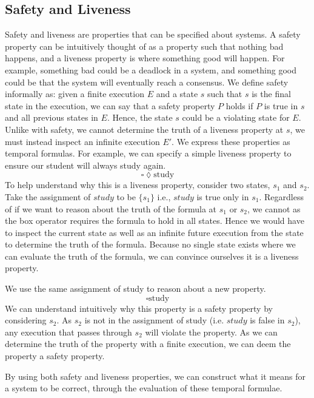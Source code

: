 \subsection{Safety and Liveness}
Safety and liveness are properties that can be specified about systems. A safety property can be intuitively thought of as a property such that nothing bad happens, and a liveness property is where something good will happen. For example, something bad could be a deadlock in a system, and something good could be that the system will eventually reach a consensus. We define safety informally as: given a finite execution $E$ and a state $s$ such that $s$ is the final state in the execution, we can say that a safety property $P$ holds if $P$ is true in $s$ and all previous states in $E$. Hence, the state $s$ could be a violating state for $E$. Unlike with safety, we cannot determine the truth of a liveness property at $s$, we must instead inspect an infinite execution $E'$. We express these properties as temporal formulas. For example, we can specify a simple liveness property to ensure our student will always study again.
\[
\square \lozenge \text{study}
\]
To help understand why this is a liveness property, consider two states, $s_1$ and $s_2$. Take the assignment of $study$ to be $\{s_1\}$ i.e., $study$ is true only in $s_1$. Regardless of if we want to reason about the truth of the formula at $s_1$ or $s_2$, we cannot as the box operator requires the formula to hold in all states. Hence we would have to inspect the current state as well as an infinite future execution from the state to determine the truth of the formula. Because no single state exists where we can evaluate the truth of the formula, we can convince ourselves it is a liveness property.
\par
We use the same assignment of study to reason about a new property.
\[
\square \text{study}
\]
We can understand intuitively why this property is a safety property by considering $s_2$. As $s_2$ is not in the assignment of study (i.e. $study$ is false in $s_2$), any execution that passes through $s_2$ will violate the property. As we can determine the truth of the property with a finite execution, we can deem the property a safety property.
\par
By using both safety and liveness properties, we can construct what it means for a system to be correct, through the evaluation of these temporal formulae.
